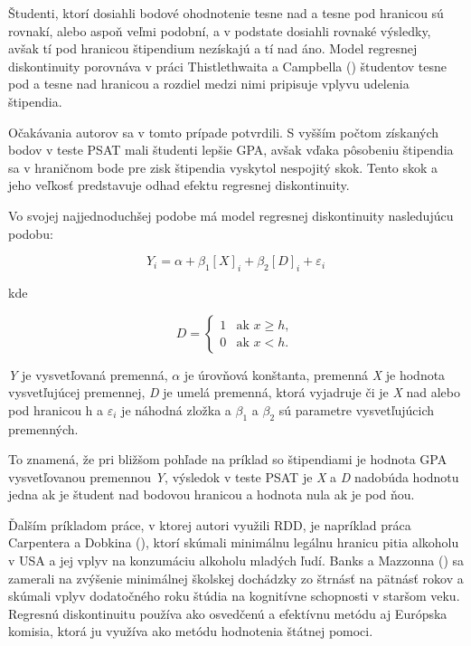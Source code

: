 \documentclass[
  digital, %
  twoside, %
  notable,   %
  lof,     %
  lot,     %
]{fithesis3}
\begin{document}
		Študenti, ktorí dosiahli bodové ohodnotenie tesne nad a tesne pod hranicou sú rovnakí, alebo aspoň veľmi podobní, a v podstate dosiahli rovnaké výsledky, avšak tí pod hranicou štipendium nezískajú a tí nad áno. Model regresnej diskontinuity porovnáva v práci Thistlethwaita a Campbella (\citeyear{thist1960}) študentov tesne pod a tesne nad hranicou a rozdiel medzi nimi pripisuje vplyvu udelenia štipendia. 
	
		Očakávania autorov sa v tomto prípade potvrdili. S vyšším počtom získaných bodov  v teste PSAT mali študenti lepšie GPA, avšak vďaka pôsobeniu štipendia sa v hraničnom bode pre zisk štipendia vyskytol nespojitý skok. Tento skok a jeho veľkosť predstavuje odhad efektu regresnej diskontinuity.
		
		Vo svojej najjednoduchšej podobe má model regresnej diskontinuity nasledujúcu podobu:
		
		\begin{equation}
		Y_{i} = \alpha + \beta _{1} [\textit{X}]_{i} + \beta _{2} [\textit{D}]_{i} + \varepsilon_{i}
		\end{equation}
		
		kde 
		
		 \begin{equation}
		D = \begin{cases}
		1 & \text{ak }x\geq{h}, \\
		0 & \text{ak }x < {h}.
		\end{cases}
		\end{equation}
		
		\textit{Y} je vysvetľovaná premenná, $\alpha$ je úrovňová konštanta, premenná \textit{X} je hodnota vysvetľujúcej premennej, \textit{D} je umelá premenná, ktorá vyjadruje či je \textit{X} nad alebo pod hranicou h a $\varepsilon_{i}$ je náhodná zložka a $\beta _{1}$ a $\beta _{2}$ sú parametre vysvetľujúcich premenných. 
		
		To znamená, že pri bližšom pohľade na príklad so štipendiami je hodnota GPA vysvetľovanou premennou \textit{Y}, výsledok v teste PSAT je \textit{X} a \textit{D} nadobúda hodnotu jedna ak je študent nad bodovou hranicou a hodnota nula ak je pod ňou.
	
		Ďalším príkladom práce, v ktorej autori využili RDD, je napríklad práca Carpentera a Dobkina (\citeyear{carpenter2011}), ktorí skúmali minimálnu legálnu hranicu pitia alkoholu v USA a jej vplyv na konzumáciu alkoholu mladých ľudí. Banks a Mazzonna (\citeyear{banks2012}) sa zamerali na zvýšenie minimálnej školskej dochádzky zo štrnásť na pätnásť rokov a skúmali vplyv dodatočného roku štúdia na kognitívne schopnosti v staršom veku. Regresnú diskontinuitu používa ako osvedčenú a efektívnu metódu aj Európska komisia, ktorá ju využíva ako metódu hodnotenia štátnej pomoci. \parencite[s.~20]{ek2014} 
		
\end{document}
